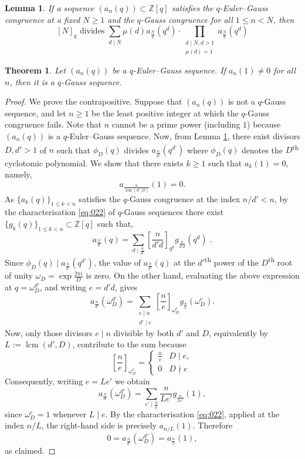 \documentclass[10pt,a4paper]{amsart}
\newtheorem{lemma}{Lemma}
\newtheorem{theorem}{Theorem}
\begin{document}
\begin{lemma}\label{lem:02}
    If a sequence $(a_n(q))\subset\mathbb{Z}[q]$ satisfies the $q$-Euler--Gauss congruence at a fixed $N\geq1$ and the $q$-Gauss congruence for all $1\leq n<N$, then 
    \[
        [N]_q\text{ divides } \sum_{d\mid N} \mu(d)a_{\frac{N}{d}}(q^d)\cdot\prod_{\substack{d\mid N, d>1\\\mu(d)=1}} a_{\frac{N}{d}}(q^d)
    \]
\end{lemma}

\begin{theorem}\label{thm:1} 
    Let $(a_n(q))$ be a $q$-Euler--Gauss sequence. If $a_{n}(1)\neq0$ for all $n$, then it is a $q$-Gauss sequence.
\end{theorem}

\begin{proof}
We prove the contrapositive. Suppose that $(a_n(q))$ is not a $q$-Gauss sequence, and let $n\geq1$ be the least positive integer at which the $q$-Gauss congruence fails. Note that $n$ cannot be a prime power (including $1$) because $(a_n(q))$ is a $q$-Euler--Gauss sequence. Now, from Lemma \ref{lem:02}, there exist divisors $D,d'>1$ of $n$ such that $\phi_D(q)$ divides $a_\frac{n}{d'}(q^{d'})$ where $\phi_D(q)$ denotes the $D$\textsuperscript{th} cyclotomic polynomial. We show that there exists $k\geq1$ such that $a_k(1)=0$, namely, 
\[a_\frac{n}{\operatorname{lcm}(d',D)}(1)=0.\] 
As $\{a_k(q)\}_{1\leq k<n}$ satisfies the $q$-Gauss congruence at the index $n/d'<n$, by the characterisation \eqref{eq:022} of $q$-Gauss sequences there exist $\{g_k(q)\}_{1\leq k< n}\subset\mathbb{Z}[q]$ such that, 
\[
    a_\frac{n}{d'}(q)=\sum_{d\mid\frac{n}{d'}}\left[\frac{n}{d'd}\right]_{q^{d}}g_\frac{n}{d'd}(q^{d})\text{ .}
\]
Since $\phi_D(q)\mid a_\frac{n}{d'}(q^{d'})$, the value of $a_\frac{n}{d'}(q)$ at the ${d'}$\textsuperscript{th} power of the $D$\textsuperscript{th} root of unity $\omega_D=\exp{\frac{2\pi i}{D}}$ is zero. On the other hand, evaluating the above expression at $q=\omega_D^{d'}$, and writing $e=d'd$, gives
\[
a_{\frac{n}{d'}}(\omega_D^{d'})
=
\sum_{\substack{e\mid n\\d'\mid e}}
\left[\frac{n}{e}\right]_{\omega_D^e}
g_{\frac{n}{e}}(\omega_D^e).
\]
Now, only those divisors $e\mid n$ divisible by both $d'$ and $D$, equivalently by $L:=\operatorname{lcm}(d',D)$, contribute to the sum because
\[\left[\frac{n}{e}\right]_{\omega_D^e}=
\begin{cases}
    \frac{n}{e}&D\mid e,\\
    0&D\nmid e
\end{cases}
\]
Consequently, writing $e=Le'$ we obtain
\[
a_{\frac{n}{d'}}(\omega_D^{d'})
=
\sum_{e'\mid\frac{n}{L}}
\frac{n}{Le'}g_{\frac{n}{Le'}}(1),
\]
since $\omega_D^e=1$ whenever $L\mid e$. By the characterisation \eqref{eq:022}, applied at the index $n/L$, the right-hand side is precisely $a_{n/L}(1)$. Therefore
\[
0=a_{\frac{n}{d'}}(\omega_D^{d'})=a_{\frac{n}{L}}(1),
\]
as claimed.



\end{proof}
\end{document}
